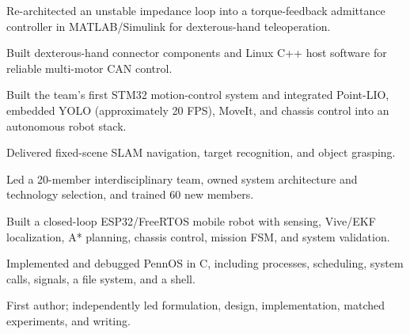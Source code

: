 \documentclass[10pt,a4paper]{article}
\begin{document}
\begin{cvitems}
  \item Re-architected an unstable impedance loop into a torque-feedback admittance controller in MATLAB/Simulink for dexterous-hand teleoperation.
  \item Built dexterous-hand connector components and Linux C++ host software for reliable multi-motor CAN control.
\end{cvitems}

\begin{cvitems}
  \item Built the team's first STM32 motion-control system and integrated Point-LIO, embedded YOLO (approximately 20 FPS), MoveIt, and chassis control into an autonomous robot stack.
  \item Delivered fixed-scene SLAM navigation, target recognition, and object grasping.
  \item Led a 20-member interdisciplinary team, owned system architecture and technology selection, and trained 60 new members.
\end{cvitems}

\begin{cvitems}
  \item Built a closed-loop ESP32/FreeRTOS mobile robot with sensing, Vive/EKF localization, A* planning, chassis control, mission FSM, and system validation.
\end{cvitems}

\begin{cvitems}
  \item Implemented and debugged PennOS in C, including processes, scheduling, system calls, signals, a file system, and a shell.
\end{cvitems}

\begin{cvitems}
  \item First author; independently led formulation, design, implementation, matched experiments, and writing.
\end{cvitems}
\end{document}

